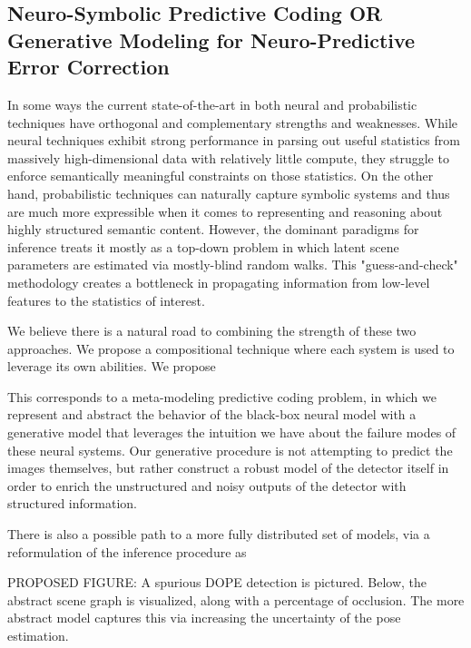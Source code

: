 \subsection{Neuro-Symbolic Predictive Coding OR Generative Modeling for Neuro-Predictive Error Correction}

In some ways the current state-of-the-art in both neural and probabilistic
techniques have orthogonal and complementary strengths and weaknesses. While
neural techniques exhibit strong performance in parsing out useful statistics
from massively high-dimensional data with relatively little compute, they
struggle to enforce semantically meaningful constraints on those statistics. On
the other hand, probabilistic techniques can naturally capture symbolic systems
and thus are much more expressible when it comes to representing and reasoning
about highly structured semantic content. However, the dominant paradigms for
inference treats it mostly as a top-down problem in which latent scene
parameters are estimated via mostly-blind random walks. This "guess-and-check"
methodology creates a bottleneck in propagating information from low-level
features to the statistics of interest.

We believe there is a natural road to combining the strength of these two
approaches. We propose a compositional technique where each system is used to
leverage its own abilities. We propose 

This corresponds to a meta-modeling predictive coding problem, in which we
represent and abstract the behavior of the black-box neural model with a
generative model that leverages the intuition we have about the failure modes
of these neural systems. Our generative procedure is not attempting to predict
the images themselves, but rather construct a robust model of the detector
itself in order to enrich the unstructured and noisy outputs of the detector
with structured information.

There is also a possible path to a more fully distributed set of models, via a
reformulation of the inference procedure as 

PROPOSED FIGURE: A spurious DOPE detection is pictured. Below, the abstract
scene graph is visualized, along with a percentage of occlusion. The more
abstract model captures this via increasing the uncertainty of the pose
estimation.
